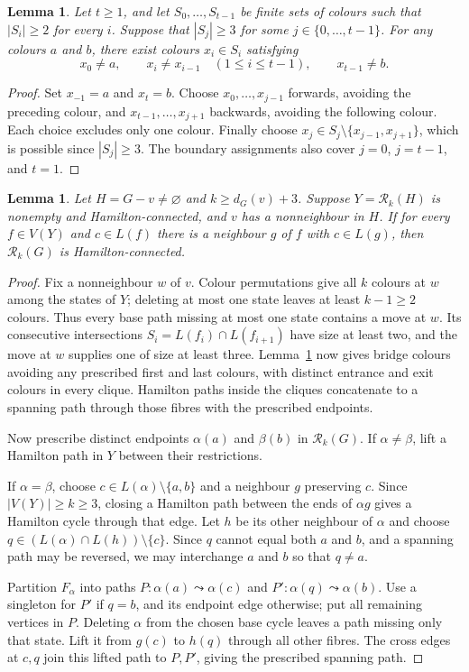 \documentclass[11pt]{article}
\newtheorem{lemma}[theorem]{Lemma}
\theoremstyle{remark}
\newcommand{\Rk}{\mathcal R_k}
\numberwithin{equation}{section}
\numberwithin{table}{section}
\begin{document}
\begin{lemma}\label{lem:bridge-colours}
Let $t\ge1$, and let $S_0,\ldots,S_{t-1}$ be finite sets of colours
such that $|S_i|\ge2$ for every $i$. Suppose that $|S_j|\ge3$ for
some $j\in\{0,\ldots,t-1\}$. For any colours $a$ and $b$, there exist
colours $x_i\in S_i$ satisfying
\[
x_0\ne a,\qquad
x_i\ne x_{i-1}\quad(1\le i\le t-1),\qquad
x_{t-1}\ne b.
\]
\end{lemma}

\begin{proof}
Set $x_{-1}=a$ and $x_t=b$. Choose $x_0,\ldots,x_{j-1}$ forwards,
avoiding the preceding colour, and $x_{t-1},\ldots,x_{j+1}$
backwards, avoiding the following colour. Each choice excludes only
one colour. Finally choose $x_j\in S_j\setminus\{x_{j-1},x_{j+1}\}$,
which is possible since $|S_j|\ge3$. The boundary assignments also
cover $j=0$, $j=t-1$, and $t=1$.
\end{proof}

\begin{lemma}\label{lem:clique-endpoints}
Let $H=G-v\ne\varnothing$ and $k\ge d_G(v)+3$.
Suppose $Y=\Rk(H)$ is nonempty and Hamilton-connected, and $v$ has
a nonneighbour in $H$. If for every $f\in V(Y)$ and $c\in L(f)$
there is a neighbour $g$ of $f$ with $c\in L(g)$, then
$\Rk(G)$ is Hamilton-connected.
\end{lemma}
\begin{proof}
Fix a nonneighbour $w$ of $v$. Colour permutations give all $k$
colours at $w$ among the states of $Y$; deleting at most one state
leaves at least $k-1\ge2$ colours. Thus every base path missing at
most one state contains a move at $w$. Its consecutive intersections
$S_i=L(f_i)\cap L(f_{i+1})$ have size at least two, and the move at
$w$ supplies one of size at least three.
Lemma~\ref{lem:bridge-colours} now gives bridge colours avoiding any
prescribed first and last colours, with distinct entrance and exit
colours in every clique. Hamilton paths inside the cliques concatenate
to a spanning path through those fibres with the prescribed endpoints.

Now prescribe distinct endpoints $\alpha(a)$ and $\beta(b)$ in
$\Rk(G)$. If $\alpha\ne\beta$, lift a Hamilton path in $Y$ between
their restrictions.

If $\alpha=\beta$, choose $c\in L(\alpha)\setminus\{a,b\}$ and
a neighbour $g$ preserving $c$. Since $|V(Y)|\ge k\ge3$, closing
a Hamilton path between the ends of $\alpha g$ gives a Hamilton
cycle through that edge. Let $h$ be its other neighbour of $\alpha$
and choose $q\in(L(\alpha)\cap L(h))\setminus\{c\}$.
Since $q$ cannot equal both $a$ and $b$, and a spanning path may be
reversed, we may interchange $a$ and $b$ so that $q\ne a$.

Partition $F_\alpha$ into paths
$P:\alpha(a)\leadsto\alpha(c)$ and
$P':\alpha(q)\leadsto\alpha(b)$.
Use a singleton for $P'$ if $q=b$, and its endpoint edge otherwise;
put all remaining vertices in $P$. Deleting $\alpha$ from the chosen
base cycle leaves a path missing only that state. Lift it from $g(c)$
to $h(q)$ through all other fibres. The cross edges at $c,q$ join
this lifted path to $P,P'$, giving the prescribed spanning path.
\end{proof}
\end{document}
